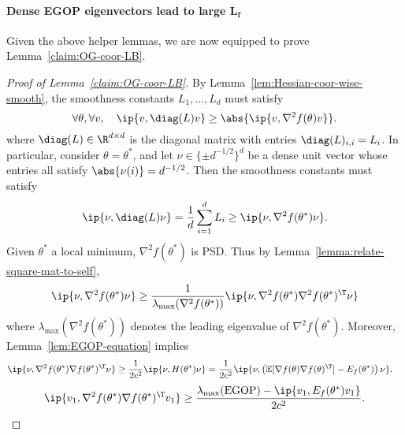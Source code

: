 \paragraph{Dense EGOP eigenvectors lead to large $\mathbf{L_f}$} Given the above helper lemmas, we are now equipped to prove Lemma~\ref{claim:OG-coor-LB}.
\begin{proof}[Proof of Lemma~\ref{claim:OG-coor-LB}]
    By Lemma~\ref{lem:Hessian-coor-wise-smooth},  the smoothness constants $L_1,\dots,L_d$ must satisfy
    \[
        \forall \theta, \forall v, \quad \ip{v, \diag(L) v} \geq \abs{\ip{v, \nabla^2 f(\theta) v}}.
    \]
    where $\diag(L)\in \R^{d\times d}$ is the diagonal matrix with entries $\diag(L)_{i,i} = L_i$. In particular, consider $\theta=\theta^*$, and let $\nu \in \{\pm d^{-1/2}\}^d$ be a dense unit vector whose entries all satisfy $\abs{\nu(i)} = d^{-1/2}$. Then the smoothness constants must satisfy
    \[
        \ip{\nu, \diag(L)\nu} =\frac{1}{d}\sum_{i=1}^d L_i \geq \ip{\nu, \nabla^2 f(\theta^*) \nu}.
    \]
    Given $\theta^*$ a local minimum, $\nabla^2 f(\theta^*)$ is PSD. Thus by Lemma~\ref{lemma:relate-square-mat-to-self}, 
    \[
        \ip{\nu, \nabla^2 f(\theta^*) \nu} \geq \frac{1}{\lambda_{\max}(\nabla^2 f(\theta^*))}\ip{\nu, \nabla^2 f(\theta^*)\nabla^2 f(\theta^*)^\T \nu}
    \]
    where $\lambda_{\max}(\nabla^2 f(\theta^*))$ denotes the leading eigenvalue of $\nabla^2 f(\theta^*)$. Moreover,  Lemma~\ref{lem:EGOP-equation} implies
    \begin{align*}
        \ip{\nu, \nabla^2 f(\theta^*) \nabla f(\theta^*)^\T \nu} &\geq \frac{1}{2c^2} \ip{\nu, H(\theta^*) \nu}=\frac{1}{2c^2}\ip{ \nu,\left(\mathbb{E}[\nabla f(\theta) \nabla f(\theta)^\T] - E_f(\theta^*)\right)\nu}.
    \end{align*}
    \[
        \ip{v_1, \nabla^2 f(\theta^*) \nabla f(\theta^*)^\T v_1} \geq \frac{\lambda_{\max}(\operatorname{EGOP}) - \ip{v_1, E_f(\theta^*) v_1}}{2 c^2}.
    \]
    

\end{proof}
